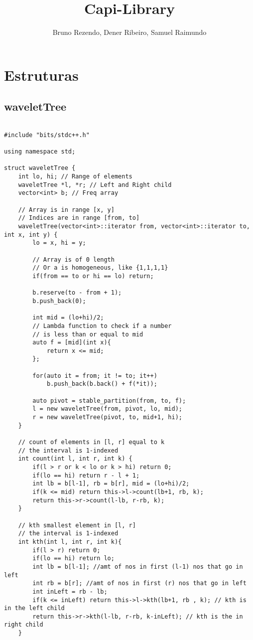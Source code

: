 \documentclass[landscape,twocolumn,10pt,a4paper]{article}
\title{Capi-Library
}
\author{Bruno Rezendo, Dener Ribeiro, Samuel Raimundo}
\begin{document}
\maketitle

\tableofcontents\section{Estruturas}
\subsection{waveletTree}
\begin{verbatim}

#include "bits/stdc++.h"

using namespace std;

struct waveletTree {
    int lo, hi; // Range of elements
    waveletTree *l, *r; // Left and Right child
    vector<int> b; // Freq array

    // Array is in range [x, y]
    // Indices are in range [from, to]
    waveletTree(vector<int>::iterator from, vector<int>::iterator to, int x, int y) {
        lo = x, hi = y;

        // Array is of 0 length
        // Or a is homogeneous, like {1,1,1,1}
        if(from == to or hi == lo) return;

        b.reserve(to - from + 1);
        b.push_back(0);

        int mid = (lo+hi)/2;
        // Lambda function to check if a number
        // is less than or equal to mid
        auto f = [mid](int x){
			return x <= mid;
		};

        for(auto it = from; it != to; it++)
			b.push_back(b.back() + f(*it));

        auto pivot = stable_partition(from, to, f);
		l = new waveletTree(from, pivot, lo, mid);
		r = new waveletTree(pivot, to, mid+1, hi);
    }

    // count of elements in [l, r] equal to k
    // the interval is 1-indexed
	int count(int l, int r, int k) {
		if(l > r or k < lo or k > hi) return 0;
		if(lo == hi) return r - l + 1;
		int lb = b[l-1], rb = b[r], mid = (lo+hi)/2;
		if(k <= mid) return this->l->count(lb+1, rb, k);
		return this->r->count(l-lb, r-rb, k);
	}

    // kth smallest element in [l, r]
    // the interval is 1-indexed
	int kth(int l, int r, int k){
		if(l > r) return 0;
		if(lo == hi) return lo;
		int lb = b[l-1]; //amt of nos in first (l-1) nos that go in left 
		int rb = b[r]; //amt of nos in first (r) nos that go in left
		int inLeft = rb - lb;
		if(k <= inLeft) return this->l->kth(lb+1, rb , k); // kth is in the left child
		return this->r->kth(l-lb, r-rb, k-inLeft); // kth is the in right child
	}


\end{verbatim}
\end{document}
